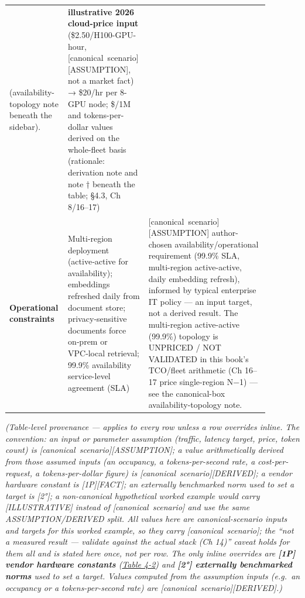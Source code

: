 \begin{longtable}[]{@{}
  >{\raggedright\arraybackslash}p{0.1942\linewidth}
  >{\raggedright\arraybackslash}p{0.2331\linewidth}
  >{\raggedright\arraybackslash}p{0.4507\linewidth}@{}}
(availability-topology note beneath the sidebar). & \textbf{illustrative
2026 cloud-price input} (\$2.50/H100-GPU-hour, \mbox{{[}canonical
scenario{]}}\hspace{0pt}\mbox{{[}ASSUMPTION{]}}, not a market fact) → \$20/hr per 8-GPU
node; \$/1M and tokens-per-dollar values derived on the whole-fleet
basis (rationale: derivation note and note † beneath the table; §4.3, Ch
8/16--17) \\
\textbf{Operational constraints} & Multi‑region deployment
(active‑active for availability); embeddings refreshed daily from
document store; privacy‑sensitive documents force on‑prem or VPC‑local
retrieval; 99.9\% availability service-level agreement (SLA) &
\mbox{{[}canonical scenario{]}}\hspace{0pt}\mbox{{[}ASSUMPTION{]}} author-chosen
availability/operational requirement (99.9\% SLA, multi-region
active-active, daily embedding refresh), informed by typical enterprise
IT policy --- an input target, not a derived result. The multi-region
active-active (99.9\%) topology is UNPRICED / NOT VALIDATED in this
book's TCO/fleet arithmetic (Ch 16--17 price single-region N−1) --- see
the canonical-box availability-topology note. \\
\end{longtable}

\emph{(Table-level provenance --- applies to every row unless a row
overrides inline. The convention: an input or parameter assumption
(traffic, latency target, price, token count) is \mbox{{[}canonical
scenario{]}}\hspace{0pt}\mbox{{[}ASSUMPTION{]}}; a value arithmetically derived from those
assumed inputs (an occupancy, a tokens-per-second rate, a
cost-per-request, a tokens-per-dollar figure) is \mbox{{[}canonical
scenario{]}}\hspace{0pt}\mbox{{[}DERIVED{]}}; a vendor hardware constant is
\mbox{{[}1P{]}}\hspace{0pt}\mbox{{[}FACT{]}}; an externally benchmarked norm used to set a target
is \mbox{{[}2°{]}}; a non-canonical hypothetical worked example would carry
\mbox{{[}ILLUSTRATIVE{]}} instead of \mbox{{[}canonical scenario{]}} and use the same
ASSUMPTION/DERIVED split. All values here are canonical-scenario inputs
and targets for this worked example, so they carry \mbox{{[}canonical
scenario{]}}; the ``not a measured result --- validate against the actual
stack (Ch 14)'' caveat holds for them all and is stated here once, not
per row. The only inline overrides are \textbf{\mbox{{[}1P{]}} vendor hardware
constants} (\hyperref[tab:4.2]{Table 4-2}) and \textbf{\mbox{{[}2°{]}} externally benchmarked
norms} used to set a target. Values computed from the assumption inputs
(e.g.~an occupancy or a tokens-per-second rate) are \mbox{{[}canonical
scenario{]}}\hspace{0pt}\mbox{{[}DERIVED{]}}.)}

